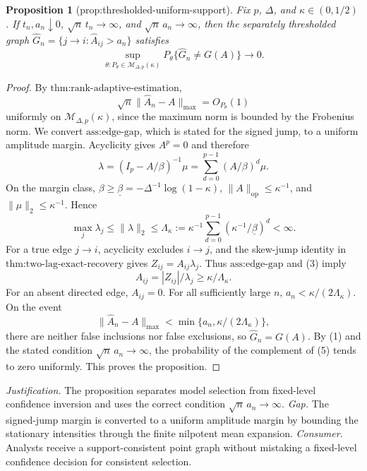 \documentclass{article}
\newtheorem{proposition}{Proposition}
\begin{document}
\begin{proposition}[prop:thresholded-uniform-support]\label{prop:thresholded-uniform-support}
Fix \(p\), \(\Delta\), and \(\kappa\in(0,1/2)\). If \(t_n,a_n\downarrow0\), \(\sqrt n\,t_n\to\infty\), and \(\sqrt n\,a_n\to\infty\), then the separately thresholded graph \(\widehat G_n=\{j\to i:\widehat A_{ij}>a_n\}\) satisfies \[\sup_{\theta:P_{\theta}\in\mathcal M_{\Delta,p}(\kappa)}P_{\theta}\{\widehat G_n\neq G(A)\}\longrightarrow0.\]
\end{proposition}
\begin{proof}
By \(\text{thm:rank-adaptive-estimation}\),
\[
 \sqrt n\lVert\widehat A_n-A\rVert_{\max}=O_{P_\theta}(1)
\tag{1}
\]
uniformly on \(\mathcal M_{\Delta,p}(\kappa)\), since the maximum norm is bounded by the Frobenius norm.  We convert \(\text{ass:edge-gap}\), which is stated for the signed jump, to a uniform amplitude margin.  Acyclicity gives \(A^p=0\) and therefore
\[
 \lambda=(I_p-A/\beta)^{-1}\mu
 =\sum_{d=0}^{p-1}(A/\beta)^d\mu.
\tag{2}
\]
On the margin class, \(\beta\geq\underline\beta=-\Delta^{-1}\log(1-\kappa)\), \(\lVert A\rVert_{\mathrm{op}}\leq\kappa^{-1}\), and \(\lVert\mu\rVert_2\leq\kappa^{-1}\).  Hence
\[
 \max_j\lambda_j\leq\lVert\lambda\rVert_2
 \leq\Lambda_\kappa:=\kappa^{-1}
 \sum_{d=0}^{p-1}(\kappa^{-1}/\underline\beta)^d<\infty.
\tag{3}
\]
For a true edge \(j\to i\), acyclicity excludes \(i\to j\), and the skew-jump identity in \(\text{thm:two-lag-exact-recovery}\) gives \(Z_{ij}=A_{ij}\lambda_j\).  Thus \(\text{ass:edge-gap}\) and (3) imply
\[
 A_{ij}=|Z_{ij}|/\lambda_j\geq\kappa/\Lambda_\kappa.
\tag{4}
\]
For an absent directed edge, \(A_{ij}=0\).  For all sufficiently large \(n\), \(a_n<\kappa/(2\Lambda_\kappa)\).  On the event
\[
 \lVert\widehat A_n-A\rVert_{\max}
 <\min\{a_n,\kappa/(2\Lambda_\kappa)\},
\tag{5}
\]
there are neither false inclusions nor false exclusions, so \(\widehat G_n=G(A)\).  By (1) and the stated condition \(\sqrt n\,a_n\to\infty\), the probability of the complement of (5) tends to zero uniformly.  This proves the proposition.
\end{proof}
\par\smallskip\noindent \textit{Justification.} The proposition separates model selection from fixed-level confidence inversion and uses the correct condition \(\sqrt n\,a_n\to\infty\). \textit{Gap.} The signed-jump margin is converted to a uniform amplitude margin by bounding the stationary intensities through the finite nilpotent mean expansion. \textit{Consumer.} Analysts receive a support-consistent point graph without mistaking a fixed-level confidence decision for consistent selection.
\end{document}
